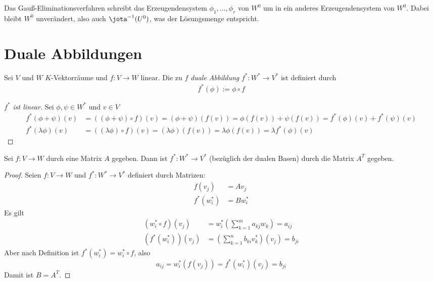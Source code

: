 \documentclass[a4paper, 10pt]{scrbook}
\begin{document}
Das Gauß-Eliminationsverfahren schreibt das Erzeugendensystem $\phi_1,\dotsc,\phi_r$ von $W^0$ um in ein
anderes Erzeugendensystem von $W^0$.
Dabei bleibt $W^0$ unverändert, also auch $\jota^{-1}(U^0)$, was der Lösungsmenge entspricht.

\section{Duale Abbildungen}

\begin{df}
\label{df:9.10}
Sei $V$ und $W$ $K$-Vektorräume und $f:V\to W$ linear.
Die zu $f$ \emph{duale Abbildung} $f^*:W^*\to V^*$ ist definiert durch
\begin{align*}
	\boxed {f^*(\phi):=\phi\circ f}
\end{align*}
\end{df}

\begin{center}
      \end{center}


\begin{proof}[$f^*$ ist linear]
Sei $\phi,\psi\in W^*$ und $v\in V$
\begin{align*}
f^*(\phi+\psi)(v) &= ((\phi+\psi)\circ f)(v) = (\phi+\psi)(f(v))=\phi(f(v))+\psi(f(v))=f^*(\phi)(v)+f^*(\psi)(v)\\
f^*(\lambda\phi)(v)&= ((\lambda\phi)\circ f)(v)=(\lambda\phi)(f(v))=\lambda\phi(f(v))=\lambda f^*(\phi)(v)
\end{align*}
\end{proof}

\begin{prop}
\label{prop:9.11}
Sei $f:V\to W$ durch eine Matrix $A$ gegeben.
Dann ist $f^*:W^*\to V^*$ (bezüglich der dualen Basen) durch die Matrix $A^T$ gegeben.
\begin{proof}
Seien $f:V\to W$ und $f^*:W^*\to V^*$ definiert durch Matrizen:
\begin{align*}
f(v_j)&=Av_j\\
f^*(w_i^*)&=Bw_i^*
\end{align*}
Es gilt
\begin{align*}
	(w_i^*\circ f)(v_j)&=w_i^*\left(\sum_{k=1}^m a_{kj}w_k\right)=a_{ij}\\
  (f^*(w_i^*))(v_j) &=\left(\sum_{k=1}^n b_{ki}v_k^*\right)(v_j)=b_{ji}
\end{align*}
Aber nach Definition ist $f^*(w_i^*)=w_i^*\circ f$, also 
\[
	a_{ij}=w_i^*(f(v_j))=f^*(w_i^*)(v_j)=b_{ji}
\]
Damit ist $B=A^T$.
\end{proof}
\end{prop}
\end{document}
